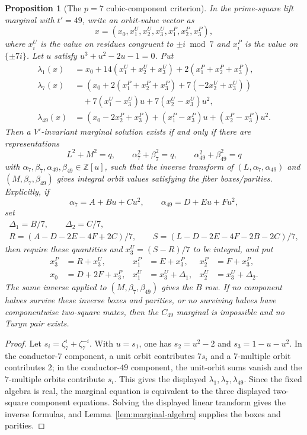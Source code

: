 \documentclass[11pt]{article}
\theoremstyle{plain}
\newtheorem{proposition}[theorem]{Proposition}
\theoremstyle{definition}
\theoremstyle{remark}
\newcommand{\Z}{\mathbb Z}
\begin{document}
\begin{proposition}[The $p=7$ cubic-component criterion]\label{prop:p7-cubic}
In the prime-square lift marginal with $t'=49$, write an orbit-value vector as
\[
  x=(x_0,x^U_1,x^U_2,x^U_3,x^P_1,x^P_2,x^P_3),
\]
where $x^U_i$ is the value on residues congruent to $\pm i\bmod 7$ and
$x^P_i$ is the value on $\{\pm7i\}$.  Let $u$ satisfy
$u^3+u^2-2u-1=0$.  Put
\[
\begin{aligned}
\lambda_1(x)
  &=x_0+14(x^U_1+x^U_2+x^U_3)+2(x^P_1+x^P_2+x^P_3),\\
\lambda_7(x)
  &=(x_0+2(x^P_1+x^P_2+x^P_3)+7(-2x^U_2+x^U_3))\\
  &\quad +7(x^U_1-x^U_3)u+7(x^U_2-x^U_3)u^2,\\
\lambda_{49}(x)
  &=(x_0-2x^P_2+x^P_3)+(x^P_1-x^P_3)u+(x^P_2-x^P_3)u^2 .
\end{aligned}
\]
Then a $V'$-invariant marginal solution exists if and only if there are
representations
\[
  L^2+M^2=q,\qquad
  \alpha_7^2+\beta_7^2=q,\qquad
  \alpha_{49}^2+\beta_{49}^2=q
\]
with $\alpha_7,\beta_7,\alpha_{49},\beta_{49}\in\Z[u]$, such that the inverse
transform of $(L,\alpha_7,\alpha_{49})$ and $(M,\beta_7,\beta_{49})$ gives
integral orbit values satisfying the fiber boxes/parities.  Explicitly, if
\[
  \alpha_7=A+Bu+Cu^2,\qquad \alpha_{49}=D+Eu+Fu^2,
\]
set
\[
\begin{gathered}
  \Delta_1=B/7,\qquad \Delta_2=C/7,\\
  R=(A-D-2E-4F+2C)/7,\qquad
  S=(L-D-2E-4F-2B-2C)/7,
\end{gathered}
\]
then require these quantities and $x^U_3=(S-R)/7$ to be integral, and put
\[
\begin{aligned}
x^P_3&=R+x^U_3,&
x^P_1&=E+x^P_3,&
x^P_2&=F+x^P_3,\\
x_0&=D+2F+x^P_3,&
x^U_1&=x^U_3+\Delta_1,&
x^U_2&=x^U_3+\Delta_2 .
\end{aligned}
\]
The same inverse applied to $(M,\beta_7,\beta_{49})$ gives the $B$ row.  If
no component halves survive these inverse boxes and parities, or no surviving
halves have componentwise two-square mates, then the $C_{49}$ marginal is
impossible and no Turyn pair exists.
\end{proposition}

\begin{proof}
Let $s_i=\zeta_7^i+\zeta_7^{-i}$.  With $u=s_1$, one has
$s_2=u^2-2$ and $s_3=1-u-u^2$.  In the conductor-$7$ component, a unit orbit
contributes $7s_i$ and a $7$-multiple orbit contributes $2$; in the
conductor-$49$ component, the unit-orbit sums vanish and the $7$-multiple
orbits contribute $s_i$.  This gives the displayed
$\lambda_1,\lambda_7,\lambda_{49}$.  Since the fixed algebra is real, the
marginal equation is equivalent to the three displayed two-square component
equations.  Solving the displayed linear transform gives the inverse formulas,
and Lemma~\ref{lem:marginal-algebra} supplies the boxes and parities.
\end{proof}
\end{document}
